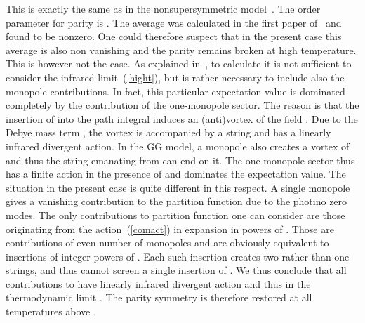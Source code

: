 \documentclass[a4paper,12pt]{article}
\begin{document}
This is exactly the same as in the nonsupersymmetric
model~\cite{gg2}. The order parameter for parity is \coordHE{}. The average \coordHE{} was calculated
in the first paper of~\cite{gg2} and found to be nonzero. One
could therefore suspect that in the present case this average is
also non vanishing and the parity remains broken at high
temperature. This is however not the case. As explained
in~\cite{gg2}, to calculate \coordHE{} it is not
sufficient to consider the infrared limit~(\ref{hight}), but is
rather necessary to include also the monopole contributions. In
fact, this particular expectation value is dominated completely by
the contribution of the one-monopole sector. The reason is that
the insertion of \coordHE{} into the path integral induces an
(anti)vortex of the field \coordHE{}. Due to the Debye mass term
\coordHE{}, the vortex is accompanied by a string and has a
linearly infrared divergent action. In the GG model, a monopole
also creates a vortex of \coordHE{} and thus the string emanating from
\coordHE{} can end on it. The one-monopole sector thus has a finite
action in the presence of \coordHE{} and dominates the expectation
value. The situation in the present case is quite different in
this respect. A single monopole gives a vanishing contribution to
the partition function due to the photino zero modes. The only
contributions to partition function one can consider are those
originating from the action~(\ref{comact}) in expansion in powers
of \coordHE{}. Those are contributions of even number of
monopoles and are obviously equivalent to insertions of integer
powers of \coordHE{}. Each such insertion creates two rather than one
strings, and thus cannot screen a single insertion of \coordHE{}. We
thus conclude that all contributions to \coordHE{} have
linearly infrared divergent action and thus in the thermodynamic
limit \coordHE{}. The parity symmetry is therefore
restored at all temperatures above \coordHE{}.
\end{document}
